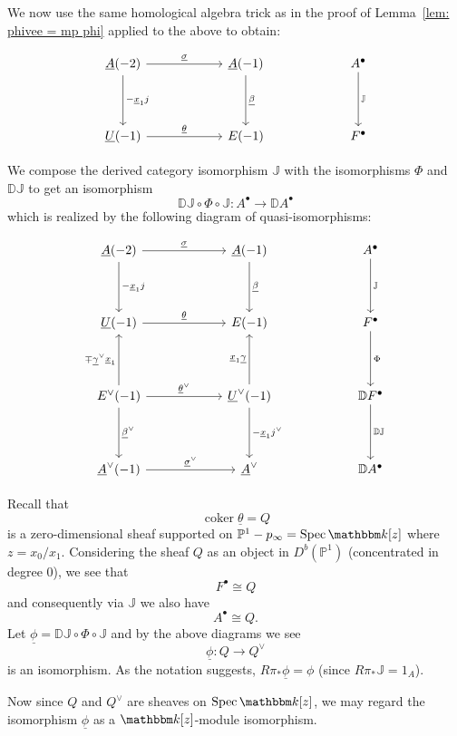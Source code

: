 \message{ !name(Bryan-Vakil.tex)}\documentclass{amsart}
\theoremstyle{definition}
\newcommand{\DD} {{\mathbb D}}
\newcommand{\JJ} {{\mathbb J}}
\newcommand{\kk} {{\mathbbm k}}
\newcommand{\PP}{\mathbb{P}}
\newcommand{\coker}{\operatorname{coker}}
\newcommand{\UL}[1]{\underline{#1}}
\newcommand{\Rpistar}{R\pi_{*}}
\begin{document}
We now use the same homological algebra trick as in the proof of
Lemma~\ref{lem: phivee = mp phi} applied to the above to obtain:

\[
\begin{tikzcd}[column sep=6em,row sep=4em]
  \UL{A}(-2)
    \arrow[d,"-\UL{x}_{1}j"]
    \arrow[r,"\UL{\sigma  }"]
  & \UL{A}(-1)
    \arrow[d,"\UL{\beta }"]
  & A^{\bullet }
    \arrow[d,"\JJ "]
  \\
  \UL{U}(-1)
    \arrow[r,"\UL{\theta }"]
  & E(-1)
  & F^{\bullet}
\end{tikzcd}
\]

We compose the derived category isomorphism $\JJ$ with the
isomorphisms $\Phi$ and $\DD \JJ$ to get an isomorphism
\[
\DD \JJ \circ \Phi \circ \JJ :A^{\bullet}\longrightarrow \DD A^{\bullet }
\]
which is realized by the following diagram of quasi-isomorphisms:

\begin{equation}\label{eqn: big diagram}
\begin{tikzcd}[column sep=6em,row sep=4em]
  \UL{A}(-2)
    \arrow[d,"-\UL{x}_{1}j"]
    \arrow[r,"\UL{\sigma  }"]
  & \UL{A}(-1)
    \arrow[d,"\UL{\beta }"]
  & A^{\bullet }
    \arrow[d,"\JJ "]
  \\
  \UL{U}(-1)
    \arrow[r,"\UL{\theta }"]
  & E(-1)
  & F^{\bullet}
    \arrow[d,"\Phi"]\\
  E^{\vee}(-1)
    \arrow[d,"\UL{\beta}^{\vee}"]
    \arrow[u,"\mp \UL{\gamma}^{\vee}\UL{x}_{1}"]
    \arrow[r,"\UL{\theta }^{\vee}"]
  & \UL{U}^{\vee }(-1)
    \arrow[d,"-\UL{x}_{1}j^{\vee}"]
    \arrow[u,"\UL{x}_{1}\UL{\gamma }"]
  & \DD F^{\bullet}
    \arrow[d,"\DD \JJ "]\\
    \UL{A}^{\vee}(-1) 
    \arrow[r,"\UL{\sigma  }^{\vee}"]
  & \UL{A}^{\vee }
  & \DD A^{\bullet} 
\end{tikzcd}
\end{equation}

Recall that 
\[
\coker \UL{\theta} = Q
\]
is a zero-dimensional sheaf supported on
$\PP^{1}-p_{\infty}=\operatorname{Spec}\kk [z]$ where
$z=x_{0}/x_{1}$. Considering the sheaf $Q$ as an object in
$D^{b}(\PP^{1})$ (concentrated in degree 0), we see that 
\[
F^{\bullet}\cong Q
\]
and consequently via $\JJ$ we also have 
\[
A^{\bullet}\cong Q.
\]
Let $\UL{\phi}=\DD \JJ \circ \Phi \circ \JJ$ and by the above diagrams
we see
\[
\UL{\phi}: Q\longrightarrow Q^{\vee}
\]
is an isomorphism. As the notation suggests, $\Rpistar \UL{\phi}=\phi$
(since $\Rpistar \JJ =1_{A}$).

Now since $Q$ and $Q^{\vee}$ are sheaves on $\operatorname{Spec}\kk
[z]$, we may regard the isomorphism $\UL{\phi }$ as a $\kk [z]$-module
isomorphism.
\end{document}
